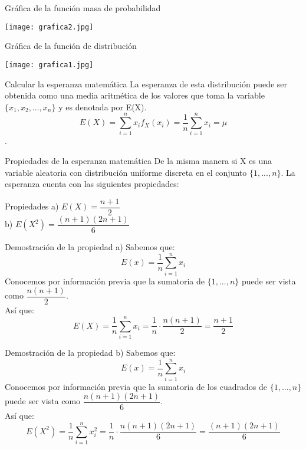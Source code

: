\documentclass[11pt]{beamer}
\begin{document}
\begin{frame}{Gráfica de la función masa de probabilidad}
\begin{center}
\texttt{[image: grafica2.jpg]}
\end{center}
\end{frame}

\begin{frame}{Gráfica de la función de distribución}
\begin{center}
\texttt{[image: grafica1.jpg]}
\end{center}
\end{frame}

\begin{frame}{Calcular la esperanza matemática}
La esperanza de esta distribución puede ser obtenida como una media aritmética de los valores que toma la variable $\lbrace  x_{1},x_{2},...,x_{n} \rbrace$ y es denotada por E(X).
$$E(X)=\sum_{i=1}^{n}x_{i}f_X(x_{i})=\dfrac{1}{n}\sum_{i=1}^{n}x_{i}=\mu$$. 
\end{frame}

\begin{frame}{Propiedades de la esperanza matemática}
De la misma manera si X es una variable aleatoria  con distribución uniforme discreta en el conjunto $\lbrace 1,...,n \rbrace$. La esperanza cuenta con las siguientes propiedades:
\begin{block}{Propiedades}
a) $E(X) = \dfrac{n + 1}{2}$ \\
b) $E(X^2) = \dfrac{(n + 1)(2n + 1)}{6}$
\end{block}
\end{frame}

\begin{frame}{Demostración de la propiedad a)}
Sabemos que:
$$E(x)=\dfrac{1}{n}\sum_{i=1}^{n}x_{i}$$
Conocemos por información previa que la sumatoria de $\lbrace 1,...,n \rbrace$ puede ser vista como $\dfrac{n(n+1)}{2}$. \\
Así que: 
$$E(X)= \dfrac{1}{n}\sum_{i=1}^{n}x_{i} = \dfrac{1}{n} \cdot \dfrac{n(n+1)}{2} = \dfrac{n + 1}{2}$$
\end{frame}

\begin{frame}{Demostración de la propiedad b)}
Sabemos que:
$$E(x)=\dfrac{1}{n}\sum_{i=1}^{n}x_{i}$$
Conocemos por información previa que la sumatoria de los cuadrados de $\lbrace 1,...,n \rbrace$ puede ser vista como $\dfrac{n(n+1)(2n+1)}{6}$.\\
Así que:
$$E(X^2)= \dfrac{1}{n}\sum_{i=1}^{n}x^2_{i} = \dfrac{1}{n} \cdot \dfrac{n(n+1)(2n+1)}{6}  = \dfrac{(n + 1)(2n + 1)}{6}$$
\end{frame}
\end{document}
